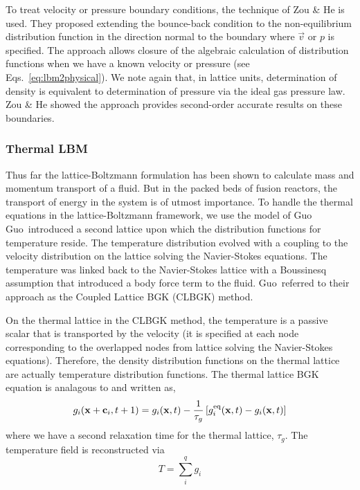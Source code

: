 To treat velocity or pressure boundary conditions, the technique of Zou \& He is used.\cite{Zou1997} They proposed extending the bounce-back condition to the non-equilibrium distribution function in the direction normal to the boundary where $\vec{v}$ or $p$ is specified. The approach allows closure of the algebraic calculation of distribution functions when we have a known velocity or pressure (see Eqs.~\ref{eq:lbm2physical}). We note again that, in lattice units, determination of density is equivalent to determination of pressure via the ideal gas pressure law. Zou \& He showed the approach provides second-order accurate results on these boundaries.\cite{Zou1997} 












\subsubsection{Thermal LBM}

Thus far the lattice-Boltzmann formulation has been shown to calculate mass and momentum transport of a fluid. But in the packed beds of fusion reactors, the transport of energy in the system is of utmost importance. To handle the thermal equations in the lattice-Boltzmann framework, we use the model of Guo\etal\cite{Guo2002} Guo\etal~introduced a second lattice upon which the distribution functions for temperature reside. The temperature distribution evolved with a coupling to the velocity distribution on the lattice solving the Navier-Stokes equations. The temperature was linked back to the Navier-Stokes lattice with a Boussinesq assumption that introduced a body force term to the fluid.\cite{Guo2002} Guo\etal~referred to their approach as the Coupled Lattice BGK (CLBGK) method. 

On the thermal lattice in the CLBGK method, the temperature is a passive scalar that is transported by the velocity (it is specified at each node corresponding to the overlapped nodes from lattice solving the Navier-Stokes equations). Therefore, the density distribution functions on the thermal lattice are actually temperature distribution functions. The thermal lattice BGK equation is analagous to  and written as,
\begin{equation}\label{eq:lbm-thermal-bgk}
	g_i(\mathbf{x}+\mathbf{c}_i, t + 1) = g_i(\mathbf{x},t) - \frac{1}{\tau_g}\left[g_i^{\text{eq}}(\mathbf{x},t) - g_i(\mathbf{x},t)\right]
\end{equation}
where we have a second relaxation time for the thermal lattice, $\tau_g$. The temperature field is reconstructed via
\begin{equation}
	T = \sum_i^q g_i
\end{equation}

